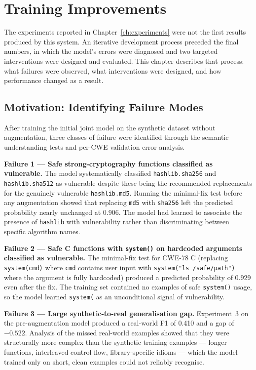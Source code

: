 \chapter{Training Improvements}
\label{ch:improvements}

The experiments reported in Chapter~\ref{ch:experiments} were not the first results produced
by this system.
An iterative development process preceded the final numbers, in which the model's errors were
diagnosed and two targeted interventions were designed and evaluated.
This chapter describes that process: what failures were observed, what interventions were
designed, and how performance changed as a result.

\section{Motivation: Identifying Failure Modes}

After training the initial joint model on the synthetic dataset without augmentation,
three classes of failure were identified through the semantic understanding tests
and per-CWE validation error analysis.

\textbf{Failure 1 --- Safe strong-cryptography functions classified as vulnerable.}
The model systematically classified \texttt{hashlib.sha256} and \texttt{hashlib.sha512}
as vulnerable despite these being the recommended replacements for the genuinely vulnerable
\texttt{hashlib.md5}.
Running the minimal-fix test before any augmentation showed that replacing \texttt{md5}
with \texttt{sha256} left the predicted probability nearly unchanged at 0.906.
The model had learned to associate the presence of \texttt{hashlib} with vulnerability
rather than discriminating between specific algorithm names.

\textbf{Failure 2 --- Safe C functions with \texttt{system()} on hardcoded arguments
classified as vulnerable.}
The minimal-fix test for CWE-78 C (replacing \texttt{system(cmd)} where \texttt{cmd}
contains user input with \texttt{system("ls /safe/path")} where the argument is fully
hardcoded) produced a predicted probability of 0.929 even after the fix.
The training set contained no examples of safe \texttt{system()} usage, so the model
learned \texttt{system(} as an unconditional signal of vulnerability.

\textbf{Failure 3 --- Large synthetic-to-real generalisation gap.}
Experiment~3 on the pre-augmentation model produced a real-world F1 of 0.410 and
a gap of $-0.522$.
Analysis of the missed real-world examples showed that they were structurally more complex
than the synthetic training examples --- longer functions, interleaved control flow,
library-specific idioms --- which the model trained only on short, clean examples could
not reliably recognise.

